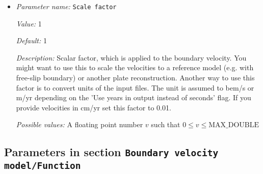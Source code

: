 \begin{itemize}
{\it Possible values:} An integer $n$ such that $-2147483648\leq n \leq 2147483647$
\item {\it Parameter name:} {\tt Scale factor}
\label{parameters:Boundary velocity model/Ascii data model/Scale factor}


{\it Value:} 1


{\it Default:} 1


{\it Description:} Scalar factor, which is applied to the boundary velocity. You might want to use this to scale the velocities to a reference model (e.g. with free-slip boundary) or another plate reconstruction. Another way to use this factor is to convert units of the input files. The unit is assumed to bem/s or m/yr depending on the 'Use years in output instead of seconds' flag. If you provide velocities in cm/yr set this factor to 0.01.


{\it Possible values:} A floating point number $v$ such that $0 \leq v \leq \text{MAX\_DOUBLE}$
\end{itemize}

\subsection{Parameters in section \tt Boundary velocity model/Function}
\label{parameters:Boundary_20velocity_20model/Function}

